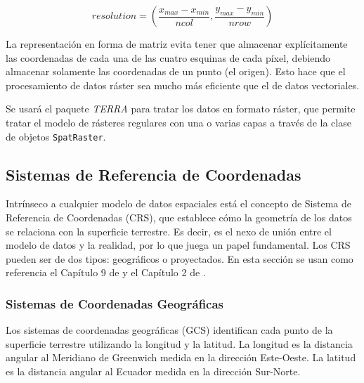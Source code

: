 \documentclass[12pt,a4paper,]{book}
\numberwithin{dummy}{section}
\theoremstyle{ocrenumbox}
\theoremstyle{blacknumex}
\theoremstyle{blacknumbox}
\theoremstyle{ocrenum}
\theoremstyle{ocrenum}
\begin{document}
\[ resolution = \left(\frac{x_{max}-x_{min}}{ncol},\frac{y_{max}-y_{min}}{nrow}\right) \]

La representación en forma de matriz evita tener que almacenar
explícitamente las coordenadas de cada una de las cuatro esquinas de
cada píxel, debiendo almacenar solamente las coordenadas de un punto (el
origen). Esto hace que el procesamiento de datos ráster sea mucho más
eficiente que el de datos vectoriales.

Se usará el paquete \emph{TERRA} para tratar los datos en formato
ráster, que permite tratar el modelo de rásteres regulares con una o
varias capas a través de la clase de objetos \texttt{SpatRaster}.

\hypertarget{sistemas-de-referencia-de-coordenadas}{%
\subsection{Sistemas de Referencia de
Coordenadas}\label{sistemas-de-referencia-de-coordenadas}}

Intrínseco a cualquier modelo de datos espaciales está el concepto de
Sistema de Referencia de Coordenadas (CRS), que establece cómo la
geometría de los datos se relaciona con la superficie terrestre. Es
decir, es el nexo de unión entre el modelo de datos y la realidad, por
lo que juega un papel fundamental. Los CRS pueden ser de dos tipos:
geográficos o proyectados. En esta sección se usan como referencia el
Capítulo 9 de \citep{introGISGimond} y el Capítulo 2 de
\citep{lovelace_geocomputation_2019}.

\hypertarget{sistemas-de-coordenadas-geogruxe1ficas}{%
\subsubsection*{Sistemas de Coordenadas
Geográficas}\label{sistemas-de-coordenadas-geogruxe1ficas}}

Los sistemas de coordenadas geográficas (GCS) identifican cada punto de
la superficie terrestre utilizando la longitud y la latitud. La longitud
es la distancia angular al Meridiano de Greenwich medida en la dirección
Este-Oeste. La latitud es la distancia angular al Ecuador medida en la
dirección Sur-Norte.
\end{document}
